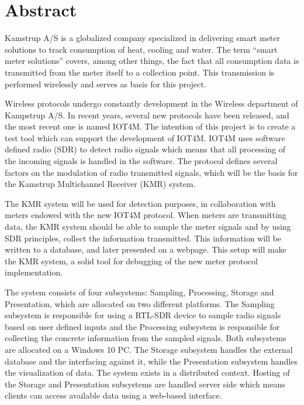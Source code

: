\chapter*{Abstract} %

Kamstrup A/S is a globalized company specialized in delivering smart meter solutions to track consumption of heat, cooling and water. The term “smart meter solutions” covers, among other things, the fact that all consumption data is transmitted from the meter itself to a collection point. This transmission is performed wirelessly and serves as basis for this project.

Wireless protocols undergo constantly development in the Wireless department of Kampstrup A/S. In recent years, several new protocols have been released, and the most recent one is named IOT4M. The intention of this project is to create a test tool which can support the development of IOT4M. IOT4M uses software defined radio (SDR) to detect radio signals which means that all processing of the incoming signals is handled in the software. The protocol defines several factors on the modulation of radio transmitted signals, which will be the basis for the Kamstrup Multichannel Receiver (KMR) system.

The KMR system will be used for detection purposes, in collaboration with meters endowed with the new IOT4M protocol. When meters are transmitting data, the KMR system should be able to sample the meter signals and by using SDR principles, collect the information transmitted. This information will be written to a database, and later presented on a webpage. This setup will make the KMR system, a solid tool for debugging of the new meter protocol implementation. 

The system consists of four subsystems: Sampling, Processing, Storage and Presentation, which are allocated on two different platforms. The Sampling subsystem is responsible for using a RTL-SDR device to sample radio signals based on user defined inputs and the Processing subsystem is responsible for collecting the concrete information from the sampled signals. Both subsystems are allocated on a Windows 10 PC. The Storage subsystem handles the external database and the interfacing against it, while the Presentation subsystem handles the visualization of data. The system exists in a distributed context. Hosting of the Storage and Presentation subsystems are handled server side which means clients can access available data using a web-based interface.

